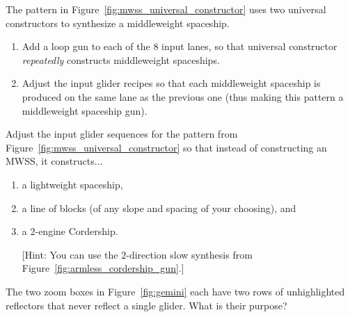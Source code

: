 \begin{multicols}{2}
	
	\mfilbreak
	
	
	\begin{problem}\label{exer:mwss_universal_constructor_turn_into_gun}
		The pattern in Figure~\ref{fig:mwss_universal_constructor} uses two universal constructors to synthesize a middleweight spaceship.
		
		\begin{enumerate}[label=\bf\color{ocre}(\alph*)]
			\item Add a loop gun to each of the 8 input lanes, so that universal constructor \emph{repeatedly} constructs middleweight spaceships.
			
			\item Adjust the input glider recipes so that each middleweight spaceship is produced on the same lane as the previous one (thus making this pattern a middleweight spaceship gun).
		\end{enumerate}
	\end{problem}
	
	
	\mfilbreak
	
	
	\begin{problem}\label{exer:mwss_universal_constructor_turn_into_other}
		Adjust the input glider sequences for the pattern from Figure~\ref{fig:mwss_universal_constructor} so that instead of constructing an MWSS, it constructs...
		
		\begin{enumerate}[label=\bf\color{ocre}(\alph*)]
			\item a lightweight spaceship,
			
			\item a line of blocks (of any slope and spacing of your choosing), and
			
			\item a $2$-engine Cordership.
			
			[Hint: You can use the $2$-direction slow synthesis from Figure~\ref{fig:armless_cordership_gun}.]
		\end{enumerate}
	\end{problem}
	
	
	\mfilbreak
	
	
	\begin{problemstar}\label{exer:gemini_unhighlighted_reflectors}
		The two zoom boxes in Figure~\ref{fig:gemini} each have two rows of unhighlighted reflectors that never reflect a single glider. What is their purpose?
	\end{problemstar}
	

\end{multicols}
